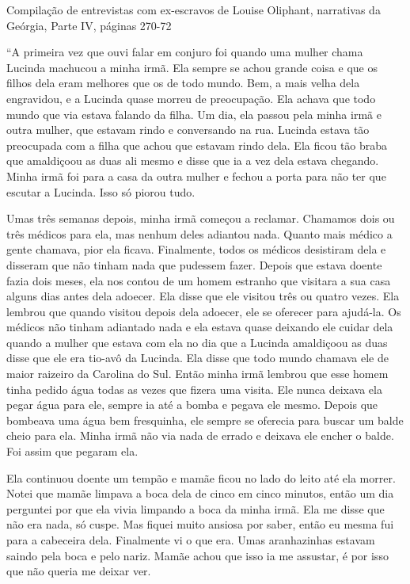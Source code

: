 Compilação de entrevistas com ex-escravos de Louise Oliphant, narrativas
da Geórgia, Parte IV, páginas 270-72

``A primeira vez que ouvi falar em conjuro foi quando uma mulher chama
Lucinda machucou a minha irmã. Ela sempre se achou grande coisa e que os
filhos dela eram melhores que os de todo mundo. Bem, a mais velha dela
engravidou, e a Lucinda quase morreu de preocupação. Ela achava que todo
mundo que via estava falando da filha. Um dia, ela passou pela minha
irmã e outra mulher, que estavam rindo e conversando na rua. Lucinda
estava tão preocupada com a filha que achou que estavam rindo dela. Ela
ficou tão braba que amaldiçoou as duas ali mesmo e disse que ia a vez
dela estava chegando. Minha irmã foi para a casa da outra mulher e
fechou a porta para não ter que escutar a Lucinda. Isso só piorou tudo.

Umas três semanas depois, minha irmã começou a reclamar. Chamamos dois
ou três médicos para ela, mas nenhum deles adiantou nada. Quanto mais
médico a gente chamava, pior ela ficava. Finalmente, todos os médicos
desistiram dela e disseram que não tinham nada que pudessem fazer.
Depois que estava doente fazia dois meses, ela nos contou de um homem
estranho que visitara a sua casa alguns dias antes dela adoecer. Ela
disse que ele visitou três ou quatro vezes. Ela lembrou que quando
visitou depois dela adoecer, ele se oferecer para ajudá-la. Os médicos
não tinham adiantado nada e ela estava quase deixando ele cuidar dela
quando a mulher que estava com ela no dia que a Lucinda amaldiçoou as
duas disse que ele era tio-avô da Lucinda. Ela disse que todo mundo
chamava ele de maior raizeiro da Carolina do Sul. Então minha irmã
lembrou que esse homem tinha pedido água todas as vezes que fizera uma
visita. Ele nunca deixava ela pegar água para ele, sempre ia até a bomba
e pegava ele mesmo. Depois que bombeava uma água bem fresquinha, ele
sempre se oferecia para buscar um balde cheio para ela. Minha irmã não
via nada de errado e deixava ele encher o balde. Foi assim que pegaram
ela.

Ela continuou doente um tempão e mamãe ficou no lado do leito até ela
morrer. Notei que mamãe limpava a boca dela de cinco em cinco minutos,
então um dia perguntei por que ela vivia limpando a boca da minha irmã.
Ela me disse que não era nada, só cuspe. Mas fiquei muito ansiosa por
saber, então eu mesma fui para a cabeceira dela. Finalmente vi o que
era. Umas aranhazinhas estavam saindo pela boca e pelo nariz. Mamãe
achou que isso ia me assustar, é por isso que não queria me deixar ver.

